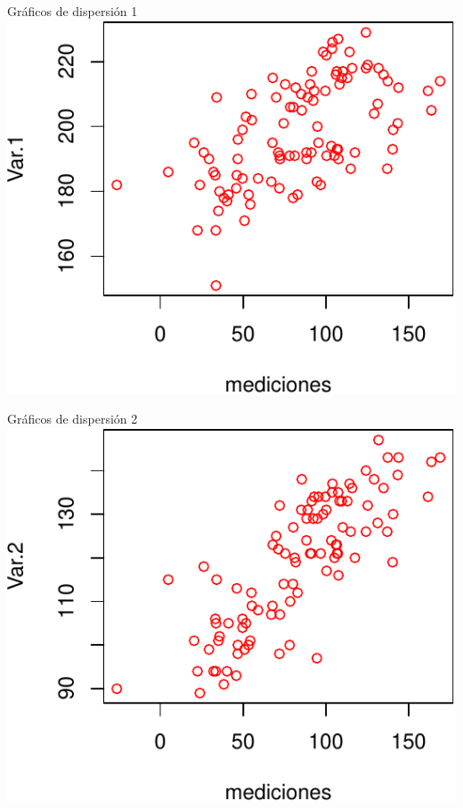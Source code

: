 \documentclass[
  11pt,
  ignorenonframetext,
]{beamer}
\begin{document}
\begin{frame}{Gráficos de dispersión 1}
\protect\hypertarget{gruxe1ficos-de-dispersiuxf3n-1}{}
\includegraphics{Correlacion-espacial_files/figure-beamer/unnamed-chunk-13-1.pdf}
\end{frame}

\begin{frame}{Gráficos de dispersión 2}
\protect\hypertarget{gruxe1ficos-de-dispersiuxf3n-2}{}
\includegraphics{Correlacion-espacial_files/figure-beamer/unnamed-chunk-14-1.pdf}
\end{frame}
\end{document}
